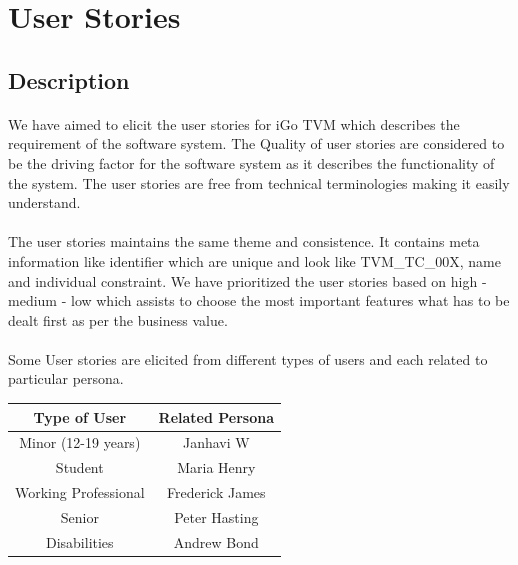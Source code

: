 \documentclass[12pt]{report}
\begin{document}
\section{User Stories}
\subsection{Description}
\paragraph{} We have aimed to elicit the user stories for iGo TVM which describes the requirement of the software system. The Quality of user stories are considered to be the driving factor for the software system as it describes the functionality of the system. The user stories are free from technical terminologies making it easily understand.
\paragraph{}The user stories maintains the same theme and consistence. It contains meta information like identifier which are unique and look like TVM\_TC\_00X, name and individual constraint. We have prioritized the user stories based on high - medium - low which assists to choose the most important features what has to be dealt first as per the business value.

\paragraph{} Some User stories are elicited from different types of users and each related to particular persona.

\begin{table}[h]
\centering
\begin{tabular}{|c|c|}
\hline
\textbf{Type of User} & \textbf{Related Persona} \\ \hline
Minor (12-19 years)   & Janhavi W  
                     \\
\hline
Student               & Maria Henry                         \\\hline
Working Professional  & Frederick James                        \\ \hline
Senior                & Peter Hasting                        \\ \hline
Disabilities          & Andrew Bond                        \\  \hline
\end{tabular}
\end{table}
\end{document}
